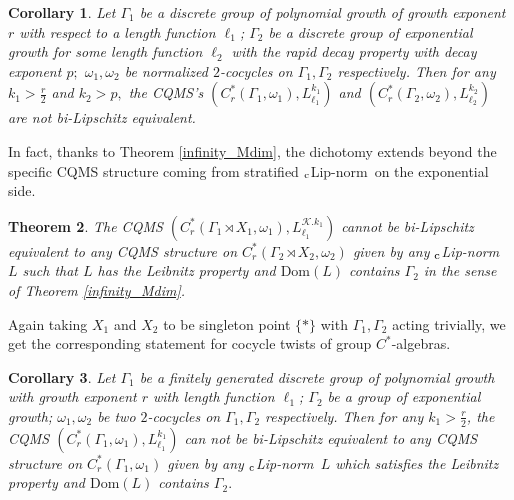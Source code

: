 \documentclass[a4paper,11pt,reqno]{amsart}
\theoremstyle{plain}
\newtheorem{thm}{Theorem}[section]
\newtheorem{cor}[thm]{Corollary}
\theoremstyle{mainthmstyle}
\theoremstyle{named}
\numberwithin{equation}{section}
\newcommand{\clipnorm}{$_{\text{\rm c}}$Lip-norm}
\begin{document}
\begin{cor}
    Let $\Gamma_{1}$ be a discrete group of polynomial growth of growth exponent $r$ with respect to a length function $\ell_{1}$; $\Gamma_{2}$ be a discrete group of exponential growth for some length function $\ell_{2}$ with the rapid decay property with decay exponent $p;$ $\omega_{1},\omega_{2}$ be normalized $2$-cocycles on $\Gamma_{1},\Gamma_{2}$ respectively. Then for any $k_{1}>\frac{r}{2}$ and $k_{2} > p,$ the CQMS's $(C^{\ast}_{r}(\Gamma_{1},\omega_{1}),L_{\ell_1}^{k_1})$ and $(C^{\ast}_{r}(\Gamma_{2},\omega_{2}),L_{\ell_2}^{k_2})$ are not bi-Lipschitz equivalent.   
\end{cor}
In fact, thanks to Theorem \ref{infinity_Mdim}, the dichotomy extends beyond the specific CQMS structure coming from stratified \clipnorm\ on the exponential side. 
\begin{thm}
    The CQMS $(C^{\ast}_{r}(\Gamma_{1}\rtimes X_{1},\omega_1), L^{\mathcal{K}.k_1}_{\ell_1})$ cannot be bi-Lipschitz equivalent to any CQMS structure on $C^{\ast}_{r}(\Gamma_{2}\rtimes X_{2},\omega_2)$ given by any \clipnorm\ $L$ such that $L$ has the Leibnitz property and $\mathrm{Dom}(L)$ contains $\Gamma_2$ in the sense of Theorem \ref{infinity_Mdim}.
\end{thm}
Again taking $X_{1}$ and $X_{2}$ to be singleton point $\{\ast\}$ with $\Gamma_{1},\Gamma_2$ acting trivially, we get the corresponding statement for cocycle twists of group $C^{\ast}$-algebras.
\begin{cor}
Let $\Gamma_1$ be a finitely generated discrete group of polynomial growth with growth exponent $r$ with length function $\ell_1$; $\Gamma_2$ be a group of exponential growth; $\omega_{1},\omega_2$ be two $2$-cocycles on $\Gamma_1,\Gamma_2$ respectively. Then for any $k_1>\frac{r}{2}$, the CQMS $(C^{\ast}_{r}(\Gamma_1,\omega_1),L^{k_1}_{\ell_1})$ can not be bi-Lipschitz equivalent to any CQMS structure on $C^{\ast}_{r}(\Gamma_1,\omega_1)$ given by any \clipnorm\ $L$ which satisfies the Leibnitz property and $\mathrm{Dom}(L)$ contains $\Gamma_2.$   
\end{cor}

\vspace{2mm}
\end{document}
